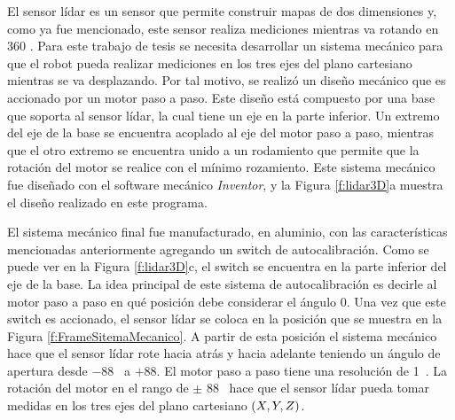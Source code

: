 
El sensor lídar es un sensor que permite construir mapas de dos dimensiones y, como ya 
fue mencionado, este sensor realiza mediciones mientras va rotando en 360 \grad. Para 
este trabajo de tesis se necesita desarrollar un sistema mecánico para que el robot 
pueda realizar mediciones en los tres ejes del plano cartesiano mientras se va 
desplazando. Por tal motivo, se realizó un diseño mecánico que es accionado por un motor
paso a paso. Este diseño está compuesto por una base que soporta al sensor lídar, la cual 
tiene un eje en la parte inferior. Un extremo del eje de la base se encuentra 
acoplado al eje del motor paso a paso, mientras que el otro extremo se encuentra unido 
a un rodamiento que permite que la rotación del motor se realice con el mínimo 
rozamiento. Este sistema mecánico fue diseñado con el software mecánico 
\textit{Inventor}, y la Figura \ref{f:lidar3D}a muestra el diseño realizado en 
este programa.

El sistema mecánico final fue manufacturado, en aluminio, con las características mencionadas
anteriormente agregando un switch de autocalibración. Como se puede ver en la Figura 
\ref{f:lidar3D}c, el switch se encuentra en la parte inferior del eje de la base. La idea 
principal de este sistema de autocalibración es decirle al motor paso a paso en qué posición 
debe considerar el ángulo 0\grad. Una vez que este switch es accionado, el sensor lídar se 
coloca en la posición que se muestra en la Figura \ref{f:FrameSitemaMecanico}. A partir de esta 
posición el sistema mecánico hace que el sensor lídar rote hacia atrás y hacia adelante teniendo 
un ángulo de apertura desde $-88$\grad~ a $+88$\grad. El motor paso a paso tiene una resolución
de 1\grad~. La rotación del motor en el rango de $\pm$ 88\grad~ hace que el sensor lídar pueda 
tomar medidas en los tres ejes del plano cartesiano $(\mathnormal X,\mathnormal Y,\mathnormal Z)$.

